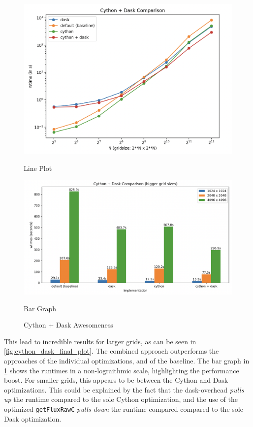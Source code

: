 \documentclass[a4paper,10pt]{article}
\begin{document}
 \begin{figure}[h!]
    \begin{minipage}{0.5\textwidth}
        \centering
        \includegraphics[width=\linewidth]{images/cython_dask/cython_dask_final_plot.png}
       \caption{Line Plot}
        \label{fig:cython_dask_final_plot}
    \end{minipage}
    \hspace{0.1cm}
    \begin{minipage}{0.5\textwidth}
        \centering
        \includegraphics[width=\linewidth]{images/cython_dask/cython_dask_final_bar.png}
       \caption{Bar Graph}
       \label{fig:cython_dask_final_bar}
   \end{minipage}
   \caption{Cython + Dask Awesomeness}
 \end{figure}
 
 This lead to incredible results for larger grids, as can be seen in \ref{fig:cython_dask_final_plot}. The combined approach outperforms the approaches of the individual optimizations, and of the baseline. The bar graph in \ref{fig:cython_dask_final_bar} shows the runtimes in a non-lograithmic scale, highlighting the performance boost. For smaller grids, this appears to be between the Cython and Dask optimizations. This could be explained by the fact that the dask-overhead \textit{pulls up} the runtime compared to the sole Cython optimization, and the use of the optimized \verb|getFluxRawC| \textit{pulls down} the runtime compared compared to the sole Dask optimization. 
\end{document}
